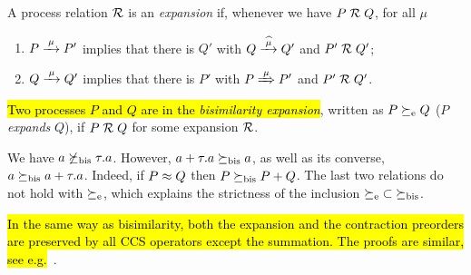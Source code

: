 
\begin{definition}%
\label{d:expa}
A process relation ${{\cal R}}$
  is an \emph{expansion} if, whenever
we have $P\mathrel{\cal R} Q$, for all $\mu$
 \begin{enumerate}
 \item   $P \arr\mu P'$ implies that there is $Q'$ with $Q \arcap \mu  Q'$
  and $P' \mathrel{\cal R} Q'$;
 \item $Q \arr\mu Q'$   implies that there is $P'$ with $P \Arr \mu P'$ and $P' \mathrel{\cal R} Q'$.
 \end{enumerate}
\hl{Two processes $P$ and $Q$ are in the \emph{bisimilarity
    expansion}}, written as $P \mathrel{\succeq_{\rm{e}}} Q$ ($P$ \emph{expands} $Q$),
 if $P \mathrel{\cal R} Q$ for some expansion ${\cal R}$.
 \end{definition}

\begin{example}
\label{exa:contr}
We have %
 $ a \not  \mathrel{\succeq_{\rm{bis}}} \tau. a$. However,
$a+ \tau . a \mathrel{\succeq_{\rm{bis}}} a$, as well as its converse, 
$  a \mathrel{\succeq_{\rm{bis}}} a +
\tau . a $. Indeed, if $P \approx Q$ then 
$  P  \mathrel{\succeq_{\rm{bis}}} P +Q$. The last two relations do not hold with 
$\mathrel{\succeq_{\rm{e}}}$, which explains the strictness of the inclusion
 ${\mathrel{\succeq_{\rm{e}}}} \subset {\mathrel{\succeq_{\rm{bis}}}}$. 
\end{example} 

\hl{In the same way as bisimilarity, both the expansion and the
contraction preorders are preserved by all CCS operators except the
summation. The proofs are similar, see e.g.}~\cite{sangiorgi2017equations}.
